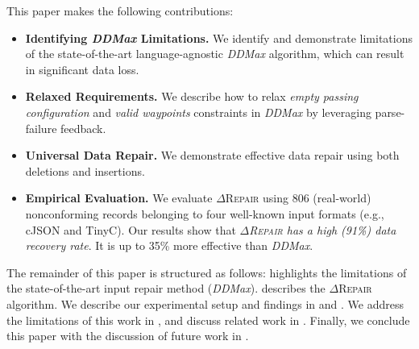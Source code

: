 \documentclass[acmsmall,screen,review,anonymous]{acmart}
\newcommand{\dtask}{data repair\xspace}
\newcommand{\approach}{\textsc{$\Delta$Repair}\xspace}
\newcommand{\ddmax}{\textit{DDMax}\xspace}
\newcommand{\drepair}{\approach}
\begin{document}
This paper makes the following
contributions:
\begin{itemize}
\item \textbf{Identifying \ddmax Limitations.}
We identify and demonstrate limitations of 
the state-of-the-art language-agnostic \ddmax algorithm, which can result in significant data loss.
\item \textbf{Relaxed Requirements.} We describe how to relax
\emph{empty passing configuration} and \emph{valid waypoints} constraints in \ddmax by leveraging parse-failure feedback.
\item \textbf{Universal Data Repair.}
We demonstrate effective \dtask using both deletions and insertions.
\item \textbf{Empirical Evaluation.} We evaluate \drepair using 806 (real-world) nonconforming
records belonging to four well-known input formats (e.g., cJSON and TinyC). 
Our results show that
\textit{\drepair has a high (91\%) data recovery rate}. 
It is up to 35\% more effective than \ddmax.

\end{itemize}

The remainder of this paper is structured as follows: 
 highlights the limitations of the 
state-of-the-art input repair method (\ddmax).
describes the \drepair algorithm. We describe our experimental setup and 
findings in  and . We address 
the limitations of this work in , and discuss related work in
. Finally, we conclude this paper 
with the discussion of future work in . 
\end{document}
